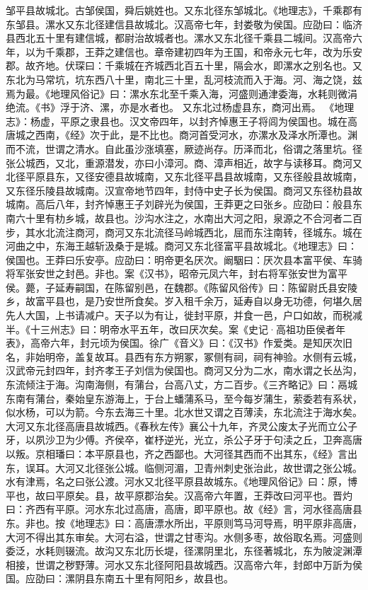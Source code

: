 \documentclass[12pt,UTF8]{ctexbook}
\begin{document}
邹平县故城北。古邹侯国，舜后姚姓也。又东北径东邹城北。《地理志》，千乘郡有东邹县。漯水又东北径建信县故城北。汉高帝七年，封娄敬为侯国。应劭曰：临济县西北五十里有建信城，都尉治故城者也。漯水又东北径千乘县二城间。汉高帝六年，以为千乘郡，王莽之建信也。章帝建初四年为王国，和帝永元七年，改为乐安郡。故齐地。伏琛曰：千乘城在齐城西北百五十里，隔会水，即漯水之别名也。又东北为马常坑，坑东西八十里，南北三十里，乱河枝流而入于海。河、海之饶，兹焉为最。《地理风俗记》曰：漯水东北至千乘入海，河盛则通津委海，水耗则微涓绝流。《书》浮于济、漯，亦是水者也。
又东北过杨虚县东，商河出焉。
《地理志》：杨虚，平原之隶县也。汉文帝四年，以封齐悼惠王子将闾为侯国也。城在高唐城之西南，《经》次于此，是不比也。商河首受河水，亦漯水及泽水所潭也。渊而不流，世谓之清水。自此虽沙涨填塞，厥迹尚存。历泽而北，俗谓之落里坑。径张公城西，又北，重源潜发，亦曰小漳河。商、漳声相近，故字与读移耳。商河又北径平原县东，又径安德县故城南，又东北径平昌县故城南，又东径般县故城南，又东径乐陵县故城南。汉宣帝地节四年，封侍中史子长为侯国。商河又东径朸县故城南。高后八年，封齐悼惠王子刘辟光为侯国，王莽更之曰张乡。应劭曰：般县东南六十里有朸乡城，故县也。沙沟水注之，水南出大河之阳，泉源之不合河者二百步，其水北流注商河，商河又东北流径马岭城西北，屈而东注南转，径城东。城在河曲之中，东海王越斩汲桑于是城。商河又东北径富平县故城北。《地理志》曰：侯国也。王莽曰乐安亭。应劭曰：明帝更名厌次。阚駰曰：厌次县本富平侯、车骑将军张安世之封邑。非也。案《汉书》，昭帝元凤六年，封右将军张安世为富平侯。薨，子延寿嗣国，在陈留别邑，在魏郡。《陈留风俗传》曰：陈留尉氏县安陵乡，故富平县也，是乃安世所食矣。岁入租千余万，延寿自以身无功德，何堪久居先人大国，上书请减户。天子以为有让，徙封平原，并食一邑，户口如故，而税减半。《十三州志》曰：明帝水平五年，改曰厌次矣。案《史记·高祖功臣侯者年表》，高帝六年，封元顷为侯国。徐广《音义》曰：《汉书》作爱类。是知厌次旧名，非始明帝，盖复故耳。县西有东方朔冢，冢侧有祠，祠有神验。水侧有云城，汉武帝元封四年，封齐孝王子刘信为侯国也。商河又分为二水，南水谓之长丛沟，东流倾注于海。沟南海侧，有蒲台，台高八丈，方二百步。《三齐略记》曰：鬲城东南有蒲台，秦始皇东游海上，于台上蟠蒲系马，至今每岁蒲生，萦委若有系状，似水杨，可以为箭。今东去海三十里。北水世又谓之百薄渎，东北流注于海水矣。大河又东北径高唐县故城西。《春秋左传》襄公十九年，齐灵公废太子光而立公子牙，以夙沙卫为少傅。齐侯卒，崔杼逆光，光立，杀公子牙于句渎之丘，卫奔高唐以叛。京相璠曰：本平原县也，齐之西鄙也。大河径其西而不出其东，《经》言出东，误耳。大河又北径张公城。临侧河湄，卫青州刺史张治此，故世谓之张公城。水有津焉，名之曰张公渡。河水又北径平原县故城东。《地理风俗记》曰：原，博平也，故曰平原矣。县，故平原郡治矣。汉高帝六年置，王莽改曰河平也。晋灼曰：齐西有平原。河水东北过高唐，高唐，即平原也。故《经》言，河水径高唐县东。非也。按《地理志》曰：高唐漂水所出，平原则笃马河导焉，明平原非高唐，大河不得出其东审矣。大河右溢，世谓之甘枣沟。水侧多枣，故俗取名焉。河盛则委泛，水耗则辍流。故沟又东北历长堤，径漯阴里北，东径著城北，东为陂淀渊潭相接，世谓之秽野薄。河水又东北径阿阳县故城西。汉高帝六年，封郎中万訢为侯国。应劭曰：漯阴县东南五十里有阿阳乡，故县也。
\end{document}
